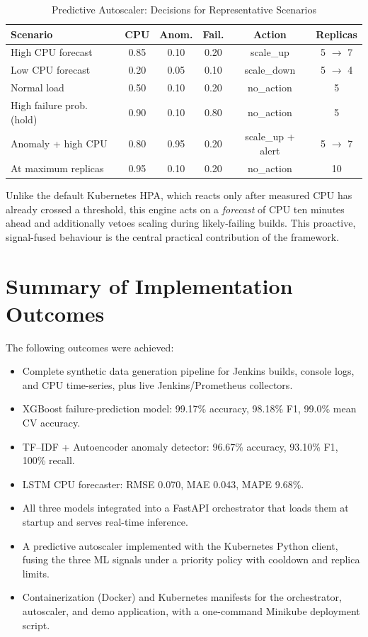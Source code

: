 \documentclass[12pt]{report}
\begin{document}
\begin{table}[h!]
\centering
\caption{Predictive Autoscaler: Decisions for Representative Scenarios}
\label{table:autoscale_results}
\begin{tabular}{|p{4.3cm}|c|c|c|c|c|}
\hline
\textbf{Scenario} & \textbf{CPU} & \textbf{Anom.} & \textbf{Fail.} & \textbf{Action} & \textbf{Replicas} \\
\hline
High CPU forecast & 0.85 & 0.10 & 0.20 & scale\_up & 5 $\rightarrow$ 7 \\
\hline
Low CPU forecast & 0.20 & 0.05 & 0.10 & scale\_down & 5 $\rightarrow$ 4 \\
\hline
Normal load & 0.50 & 0.10 & 0.20 & no\_action & 5 \\
\hline
High failure prob. (hold) & 0.90 & 0.10 & 0.80 & no\_action & 5 \\
\hline
Anomaly + high CPU & 0.80 & 0.95 & 0.20 & scale\_up + alert & 5 $\rightarrow$ 7 \\
\hline
At maximum replicas & 0.95 & 0.10 & 0.20 & no\_action & 10 \\
\hline
\end{tabular}
\end{table}

Unlike the default Kubernetes HPA, which reacts only after measured CPU has already crossed a threshold, this engine acts on a \emph{forecast} of CPU ten minutes ahead and additionally vetoes scaling during likely-failing builds. This proactive, signal-fused behaviour is the central practical contribution of the framework.

\section{Summary of Implementation Outcomes}

The following outcomes were achieved:

\begin{itemize}
    \item Complete synthetic data generation pipeline for Jenkins builds, console logs, and CPU time-series, plus live Jenkins/Prometheus collectors.
    \item XGBoost failure-prediction model: 99.17\% accuracy, 98.18\% F1, 99.0\% mean CV accuracy.
    \item TF--IDF + Autoencoder anomaly detector: 96.67\% accuracy, 93.10\% F1, 100\% recall.
    \item LSTM CPU forecaster: RMSE 0.070, MAE 0.043, MAPE 9.68\%.
    \item All three models integrated into a FastAPI orchestrator that loads them at startup and serves real-time inference.
    \item A predictive autoscaler implemented with the Kubernetes Python client, fusing the three ML signals under a priority policy with cooldown and replica limits.
    \item Containerization (Docker) and Kubernetes manifests for the orchestrator, autoscaler, and demo application, with a one-command Minikube deployment script.
\end{itemize}
\end{document}
